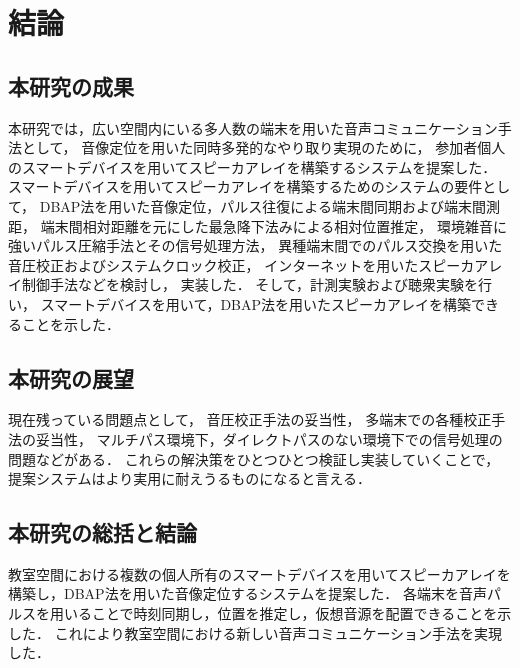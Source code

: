 \chapter{結論}
\section{本研究の成果}

本研究では，広い空間内にいる多人数の端末を用いた音声コミュニケーション手法として，
音像定位を用いた同時多発的なやり取り実現のために，
参加者個人のスマートデバイスを用いてスピーカアレイを構築するシステムを提案した．
スマートデバイスを用いてスピーカアレイを構築するためのシステムの要件として，
DBAP法を用いた音像定位，パルス往復による端末間同期および端末間測距，
端末間相対距離を元にした最急降下法みによる相対位置推定，
環境雑音に強いパルス圧縮手法とその信号処理方法，
異種端末間でのパルス交換を用いた音圧校正およびシステムクロック校正，
インターネットを用いたスピーカアレイ制御手法などを検討し，
実装した．
そして，計測実験および聴衆実験を行い，
スマートデバイスを用いて，DBAP法を用いたスピーカアレイを構築できることを示した．

\section{本研究の展望}

現在残っている問題点として，
音圧校正手法の妥当性，
多端末での各種校正手法の妥当性，
マルチパス環境下，ダイレクトパスのない環境下での信号処理の問題などがある．
これらの解決策をひとつひとつ検証し実装していくことで，
提案システムはより実用に耐えうるものになると言える．


\section{本研究の総括と結論}

教室空間における複数の個人所有のスマートデバイスを用いてスピーカアレイを構築し，DBAP法を用いた音像定位するシステムを提案した．
各端末を音声パルスを用いることで時刻同期し，位置を推定し，仮想音源を配置できることを示した．
これにより教室空間における新しい音声コミュニケーション手法を実現した．
